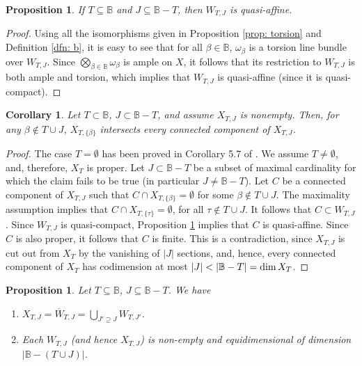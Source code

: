 \documentclass[11pt,pdflatex]{amsart}
\theoremstyle{plain}
\theoremstyle{definition}
\theoremstyle{plain}
\newtheorem{prop}[theorem]{Proposition}
\newtheorem{cor}[theorem]{Corollary}
\theoremstyle{definition}
\theoremstyle{remark}
\numberwithin{equation}{section}
\numberwithin{figure}{section} \numberwithin{table}{subsection}
\def\BB{\mathbb{B}}
\begin{document}
\begin{prop}\label{prop: quasi-affine} If $T \subseteq \BB$ and $J \subseteq \BB-T$, then $W_{T,J}$ is quasi-affine.
\end{prop}
\begin{proof} Using all the isomorphisms given in Proposition \ref{prop: torsion} and Definition \ref{dfn: b}, it is easy to see that  for all $\beta \in \BB$, $\omega_\beta$ is a torsion line bundle over $W_{T,J}$. Since $\bigotimes_{\beta \in \BB} \omega_\beta$ is ample on $X$, it follows that its restriction to $W_{T,J}$ is both ample and torsion, which implies that $W_{T,J}$ is quasi-affine (since it is quasi-compact).
\end{proof}
  
  \begin{cor}\label{cor: intersection} Let $T \subset \BB$, $J \subset \BB-T$, and assume $X_{T,J}$ is nonempty.  Then, for any $\beta \not\in T\cup J$, $X_{T,\{\beta\}}$ intersects every connected component of $X_{T,J}$.
 \end{cor}
 
 \begin{proof} The case $T=\emptyset$ has been proved in Corollary 5.7 of \cite{DK2}. We assume $T \neq \emptyset$, and, therefore, $X_T$ is proper. Let $J\subset \BB-T$ be a subset of maximal cardinality for which the claim fails to be true (in particular $J \neq \BB-T$). Let $C$ be a connected component of $X_{T,J}$ such that $C \cap X_{T,\{\beta\}}=\emptyset$ for some $\beta \not \in T\cup J$. The maximality assumption implies that $C \cap X_{T,\{\tau\}}=\emptyset$, for all $\tau \not\in T\cup J$. It follows that $C \subset W_{T,J}$. Since $W_{T,J}$ is quasi-compact, Proposition \ref{prop: quasi-affine} implies that $C$ is quasi-affine. Since $C$ is also proper, it follows that $C$ is finite. This is a contradiction, since $X_{T,J}$ is cut out from $X_T$ by the vanishing of $|J|$ sections, and, hence, every connected component of $X_T$ has codimension at most  $|J| < |\BB-T|={\rm dim}\ \!  X_T$.
 
 \end{proof}
 
    \begin{prop}  \label{prop:strata} Let $T \subseteq \BB$, $J \subseteq \BB-T$. We have
 
\begin{enumerate}
\item $X_{T,J}=\overline{W}_{T,J}=\bigcup_{J' \supseteq J} W_{T,J'}$.
\item Each $W_{T,J}$ (and hence $X_{T,J}$) is non-empty and equidimensional of dimension $|\BB-(T \cup J)|$.
\
\end{enumerate} \end{prop}
\end{document}
